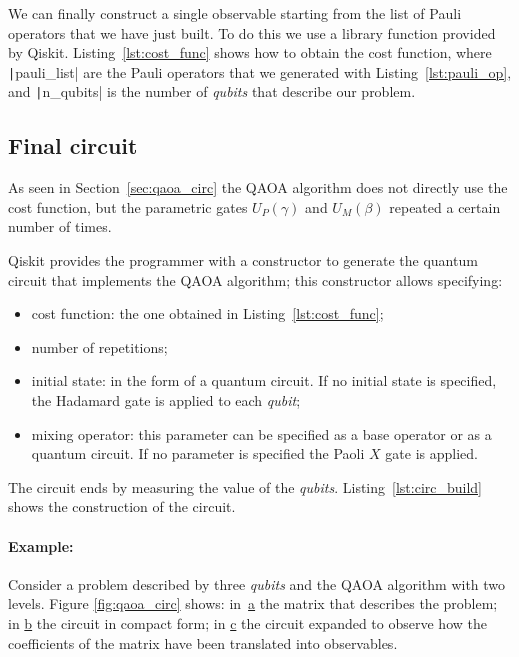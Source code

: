 We can finally construct a single observable starting from the list of Pauli operators that we have just built. To do this we use a library function provided by Qiskit. Listing~\ref{lst:cost_func} shows how to obtain the cost function, where \texttt|pauli_list| are the Pauli operators that we generated with Listing~\ref{lst:pauli_op}, and \texttt|n_qubits| is the number of \emph{qubits} that describe our problem.
\begin{listing}[h]
	\caption{Defining cost function}
	\label{lst:cost_func}
\end{listing}

\subsection{Final circuit}
As seen in Section~\ref{sec:qaoa_circ} the QAOA algorithm does not directly use the cost function, but the parametric gates $U_P(\gamma)$ and $U_M(\beta)$ repeated a certain number of times. 

Qiskit provides the programmer with a constructor to generate the quantum circuit that implements the QAOA algorithm; this constructor allows specifying:
\begin{itemize}
	\item cost function: the one obtained in Listing~\ref{lst:cost_func};
	\item number of repetitions;
	\item initial state: in the form of a quantum circuit. If no initial state is specified, the Hadamard gate is applied to each \emph{qubit};
	\item mixing operator: this parameter can be specified as a base operator or as a quantum circuit. If no parameter is specified the Paoli $X$ gate is applied.
\end{itemize}

The circuit ends by measuring the value of the \emph{qubits}. Listing~\ref{lst:circ_build} shows the construction of the circuit.

\begin{listing}[h]
	\caption{Circuit construction}
	\label{lst:circ_build}
\end{listing}

\paragraph{Example:} Consider a problem described by three \emph{qubits} and the QAOA algorithm with two levels. Figure \ref{fig:qaoa_circ} shows: in~\hyperref[fig:cost_mat]{a} the matrix that describes the problem; in \hyperref[fig:qaoa_1]{b} the circuit in compact form; in \hyperref[fig:qaoa_2]{c} the circuit expanded to observe how the coefficients of the matrix have been translated into observables.

